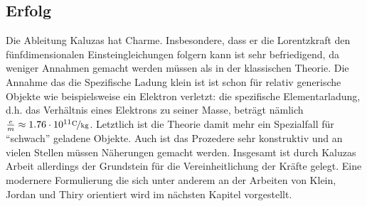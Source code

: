 \subsection{Erfolg}
Die Ableitung Kaluzas hat Charme. Insbesondere, dass er die
Lorentzkraft den fünfdimensionalen Einsteingleichungen folgern kann ist sehr 
befriedigend, da weniger Annahmen gemacht werden müssen als in der klassischen
Theorie. Die Annahme das die Spezifische Ladung klein ist ist schon für relativ
generische Objekte wie beispielsweise ein Elektron verletzt: die spezifische
Elementarladung, d.h. das Verhältnis eines Elektrons zu seiner Masse, beträgt nämlich
$\frac{e}{m}\approx1.76\cdot10^{11}\unitfrac{C}{kg}$.
Letztlich ist die Theorie damit mehr ein Spezialfall für "`schwach"' geladene
Objekte. Auch ist das Prozedere sehr konstruktiv und an vielen Stellen müssen
Näherungen gemacht werden.
Insgesamt ist durch Kaluzas Arbeit allerdings der Grundstein für die
Vereinheitlichung der Kräfte gelegt. Eine modernere Formulierung die sich unter
anderem an der Arbeiten von Klein, Jordan und Thiry orientiert wird im nächsten
Kapitel vorgestellt.

%
%

